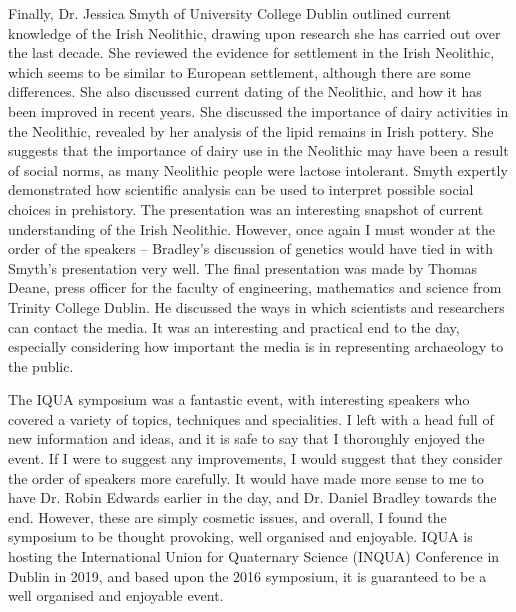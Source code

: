 \documentclass[%
	]{ijsra}
\begin{document}
Finally, Dr. Jessica Smyth of University College Dublin outlined current knowledge of the Irish Neolithic, drawing upon research she has carried out over the last decade. She reviewed the evidence for settlement in the Irish Neolithic, which seems to be similar to European settlement, although there are some differences. She also discussed current dating of the Neolithic, and how it has been improved in recent years. She discussed the importance of dairy activities in the Neolithic, revealed by her analysis of the lipid remains in Irish pottery. She suggests that the importance of dairy use in the Neolithic may have been a result of social norms, as many Neolithic people were lactose intolerant. Smyth expertly demonstrated how scientific analysis can be used to interpret possible social choices in prehistory. The presentation was an interesting snapshot of current understanding of the Irish Neolithic. However, once again I must wonder at the order of the speakers – Bradley’s discussion of genetics would have tied in with Smyth’s presentation very well. 
The final presentation was made by Thomas Deane, press officer for the faculty of engineering, mathematics and science from Trinity College Dublin. He discussed the ways in which scientists and researchers can contact the media. It was an interesting and practical end to the day, especially considering how important the media is in representing archaeology to the public. 

The IQUA symposium was a fantastic event, with interesting speakers who covered a variety of topics, techniques and specialities. I left with a head full of new information and ideas, and it is safe to say that I thoroughly enjoyed the event. If I were to suggest any improvements, I would suggest that they consider the order of speakers more carefully. It would have made more sense to me to have Dr. Robin Edwards earlier in the day, and Dr. Daniel Bradley towards the end. However, these are simply cosmetic issues, and overall, I found the symposium to be thought provoking, well organised and enjoyable. IQUA is hosting the International Union for Quaternary Science (INQUA) Conference in Dublin in 2019, and based upon the 2016 symposium, it is guaranteed to be a well organised and enjoyable event. 

\IJSRAclosing%
\end{document}
